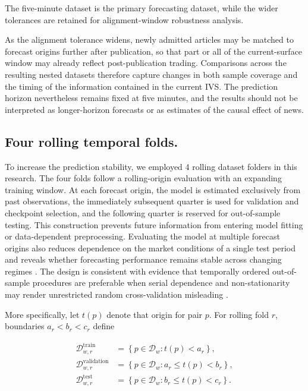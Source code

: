 The five-minute dataset is the primary forecasting dataset, while the wider tolerances are retained for alignment-window robustness analysis. 

As the alignment tolerance widens, newly admitted articles may be matched to forecast origins further after publication, so that part or all of the current-surface window may already reflect post-publication trading. Comparisons across the resulting nested datasets therefore capture changes in both sample coverage and the timing of the information contained in the current IVS. The prediction horizon nevertheless remains fixed at five minutes, and the results should not be interpreted as longer-horizon forecasts or as estimates of the causal effect of news.


\subsection*{Four rolling temporal folds.}
To increase the prediction stability, we employed 4 rolling dataset folders in this research.  The four folds follow a rolling-origin evaluation with an expanding training window. At each forecast origin, the model is estimated exclusively from past observations, the immediately subsequent quarter is used for validation and checkpoint selection, and the following quarter is reserved for out-of-sample testing. This construction prevents future information from entering model fitting or data-dependent preprocessing. Evaluating the model at multiple forecast origins also reduces dependence on the market conditions of a single test period and reveals whether forecasting performance remains stable across changing regimes \citep{tashman2000outofsample}. The design is consistent with evidence that temporally ordered out-of-sample procedures are preferable when serial dependence and non-stationarity may render unrestricted random cross-validation misleading \citep{bergmeir2012use,cerqueira2020evaluating,hewamalage2023forecast}.


More specifically, let $t(p)$ denote that origin for pair $p$. For rolling fold $r$, boundaries $a_r<b_r<c_r$ define

\begin{equation}\label{eq:ch3:rolling_fold_partition}
\begin{aligned}
\mathcal D^{\mathrm{train}}_{w,r}
&=
\left\{p\in\mathcal D_w:t(p)<a_r\right\},\\
\mathcal D^{\mathrm{validation}}_{w,r}
&=
\left\{p\in\mathcal D_w:a_r\leq t(p)<b_r\right\},\\
\mathcal D^{\mathrm{test}}_{w,r}
&=
\left\{p\in\mathcal D_w:b_r\leq t(p)<c_r\right\}.
\end{aligned}
\end{equation}

